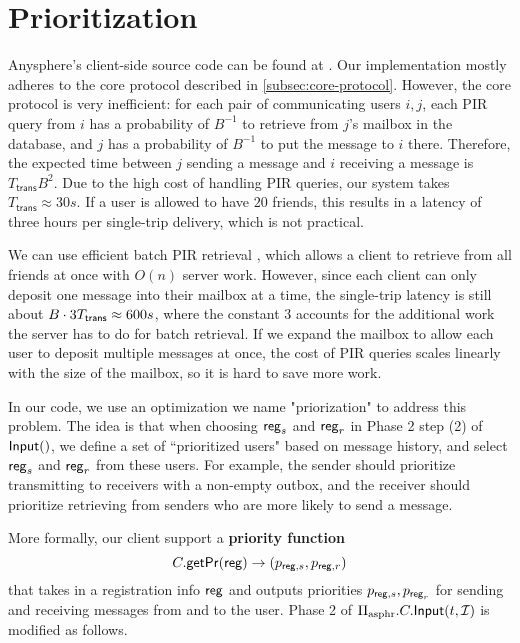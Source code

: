 \section{Prioritization}
\label{sec:actual-asphr-protocol}
Anysphere's client-side source code can be found at \cite{LZA2022implementation}. Our implementation mostly adheres to the core protocol described in \cref{subsec:core-protocol}. However, the core protocol is very inefficient: for each pair of communicating users $i, j$, each PIR query from $i$ has a probability of $B^{-1}$ to retrieve from $j$'s mailbox in the database, and $j$ has a probability of $B^{-1}$ to put the message to $i$ there. Therefore, the expected time between $j$ sending a message and $i$ receiving a message is $T_{\mathsf{trans}} B^2$. Due to the high cost of handling PIR queries, our system takes $T_{\mathsf{trans}} \approx 30s$. If a user is allowed to have $20$ friends, this results in a latency of three hours per single-trip delivery, which is not practical.

We can use efficient batch PIR retrieval \cite{BIM2000multiretrival, YERA2004batchcode, angel2016unobservable, liutromer2021}, which allows a client to retrieve from all friends at once with $O(n)$ server work. However, since each client can only deposit one message into their mailbox at a time, the single-trip latency is still about $B \cdot 3T_{\mathsf{trans}} \approx 600s$, where the constant $3$ accounts for the additional work the server has to do for batch retrieval. If we expand the mailbox to allow each user to deposit multiple messages at once, the cost of PIR queries scales linearly with the size of the mailbox, so it is hard to save more work.

In our code, we use an optimization we name "priorization" to address this problem. The idea is that when choosing $\mathsf{reg}_s$ and $\mathsf{reg}_r$ in Phase 2 step (2) of $\mathsf{Input}()$, we define a set of ``prioritized users" based on message history, and select $\mathsf{reg}_s$ and $\mathsf{reg}_r$ from these users. For example, the sender should prioritize transmitting to receivers with a non-empty outbox, and the receiver should prioritize retrieving from senders who are more likely to send a message.

More formally, our client support a \textbf{priority function}
$$C.\mathsf{getPr}(\mathsf{reg}) \to (p_{\mathsf{reg}, s}, p_{\mathsf{reg}, r})$$
that takes in a registration info $\mathsf{reg}$ and outputs priorities $p_{\mathsf{reg}, s}, p_{\mathsf{reg}_r}$ for sending and receiving messages from and to the user. Phase 2 of $\Pi_{\text{asphr}}.C.\mathsf{Input}(t, \mathcal{I})$ is modified as follows.

